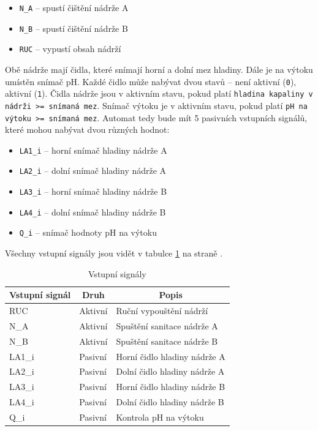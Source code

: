 \documentclass[12pt]{report}
\begin{document}
	\begin{itemize}
		\item \texttt{N\_A} – spustí čištění nádrže A
		\item \texttt{N\_B} – spustí čištění nádrže B
		\item \texttt{RUC} – vypustí obsah nádrží 
	\end{itemize}

	Obě nádrže mají čidla, které snímají horní a dolní mez hladiny. Dále je na výtoku umístěn snímač pH. Každé čidlo může nabývat dvou stavů – není aktivní (\texttt{0}), aktivní (\texttt{1}). Čidla nádrže jsou v aktivním stavu, pokud platí \texttt{hladina kapaliny v nádrži >= snímaná mez}. Snímač výtoku je v aktivním stavu, pokud platí \texttt{pH na výtoku >= snímaná mez}. Automat tedy bude mít 5 pasivních vstupních signálů, které mohou nabývat dvou různých hodnot:

	\begin{itemize}
		\item \texttt{LA1\_i} – horní snímač hladiny nádrže A
		\item \texttt{LA2\_i} – dolní snímač hladiny nádrže A
		\item \texttt{LA3\_i} – horní snímač hladiny nádrže B
		\item \texttt{LA4\_i} – dolní snímač hladiny nádrže B
		\item \texttt{Q\_i} – snímač hodnoty pH na výtoku
	\end{itemize}

	Všechny vstupní signály jsou vidět v tabulce \ref{tab:vstupni} na straně \pageref{tab:vstupni}.

	\begin{table}[]
		\centering
		\begin{tabular}{lll}
			\hline
			\multicolumn{1}{c}{Vstupní signál} 	& \multicolumn{1}{c}{Druh} & \multicolumn{1}{c}{Popis}    \\ \hline
			RUC                                 & Aktivní                  & Ruční vypouštění nádrží      \\
			N\_A                                & Aktivní                  & Spuštění sanitace nádrže A   \\
			N\_B                                & Aktivní                  & Spuštění sanitace nádrže B   \\ \hline
			LA1\_i                              & Pasivní                  & Horní čidlo hladiny nádrže A \\
			LA2\_i                              & Pasivní                  & Dolní čidlo hladiny nádrže A \\
			LA3\_i                              & Pasivní                  & Horní čidlo hladiny nádrže B \\
			LA4\_i                              & Pasivní                  & Dolní čidlo hladiny nádrže B \\
			Q\_i                                & Pasivní                  & Kontrola pH na výtoku        \\ \hline
		\end{tabular}
		\caption{Vstupní signály}
		\label{tab:vstupni}
	\end{table}
\end{document}
